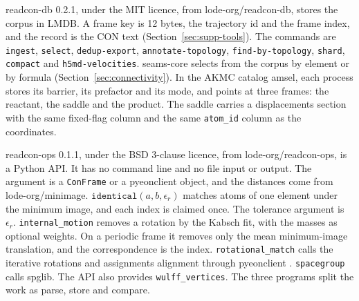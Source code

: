 readcon-db 0.2.1, under the MIT licence, from lode-org/readcon-db, stores the corpus in LMDB.
A frame key is 12 bytes, the trajectory id and the frame index, and the record is the CON text (Section~\ref{sec:supp-tools}).
The commands are \texttt{ingest}, \texttt{select}, \texttt{dedup-export}, \texttt{annotate-topology}, \texttt{find-by-topology}, \texttt{shard}, \texttt{compact} and \texttt{h5md-velocities}.
seams-core selects from the corpus by element or by formula (Section~\ref{sec:connectivity}).
In the AKMC catalog amsel, each process stores its barrier, its prefactor and its mode, and points at three frames: the reactant, the saddle and the product.
The saddle carries a displacements section with the same fixed-flag column and the same \texttt{atom\_id} column as the coordinates.

readcon-ops 0.1.1, under the BSD 3-clause licence, from lode-org/readcon-ops, is a Python API.
It has no command line and no file input or output.
The argument is a \texttt{ConFrame} or a pyeonclient object, and the distances come from lode-org/minimage.
\(\texttt{identical}(a, b, \epsilon_r)\) matches atoms of one element under the minimum image, and each index is claimed once.
The tolerance argument is \(\epsilon_r\).
\texttt{internal\_motion} removes a rotation by the Kabsch fit, with the masses as optional weights.
On a periodic frame it removes only the mean minimum-image translation, and the correspondence is the index.
\texttt{rotational\_match} calls the iterative rotations and assignments alignment through pyeonclient
\cite{gundeIRAShapeMatching2021}.
\texttt{spacegroup} calls spglib.
The API also provides \texttt{wulff\_vertices}.
The three programs split the work as parse, store and compare.
